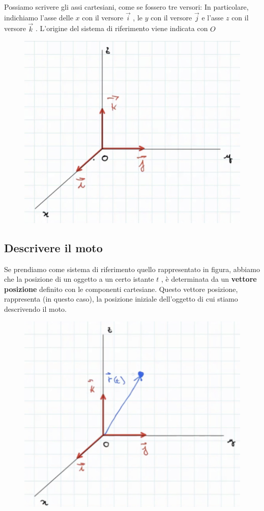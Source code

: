 Possiamo scrivere gli assi cartesiani, come se fossero tre versori: In particolare, indichiamo l'asse delle $ x $ con il versore $ \overrightarrow{i} $ , le $ y $ con il versore $ \overrightarrow{j} $ e l'asse $ z $ con il versore $ \overrightarrow{k} $ .
L'origine del sistema di riferimento viene indicata con $ O $

\begin{figure}[h]
\begin{center}
\includegraphics[width = 0.5 \textwidth]{lezione2/images/sistema riferimento2}
\label{fig:riferimento2}
\end{center}
\end{figure}
\subsection{Descrivere il moto}
Se prendiamo come sistema di riferimento quello rappresentato in figura, abbiamo che la posizione di un oggetto a un certo istante $ t $ , è determinata da un \textbf{vettore posizione} definito con le componenti cartesiane. 
\newpage
Questo vettore posizione, rappresenta (in questo caso), la posizione iniziale dell'oggetto di cui stiamo descrivendo il moto. 

\begin{figure}[h]
\begin{center}
\includegraphics[width = 0.5 \textwidth]{lezione2/images/sistema riferimento3}
\label{fig:riferimento3}
\end{center}
\end{figure}

